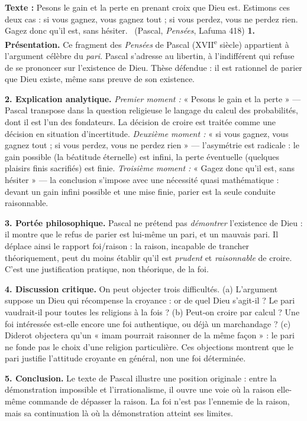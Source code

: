 \documentclass[11pt]{article}
\begin{document}
\begin{exoresolu}
\textbf{Texte :} \guillemotleft Pesons le gain et la perte en prenant croix que Dieu est. Estimons ces deux cas : si vous gagnez, vous gagnez tout ; si vous perdez, vous ne perdez rien. Gagez donc qu'il est, sans hésiter. \guillemotright\ (Pascal, \emph{Pensées}, Lafuma 418)
\tcblower
\textbf{1. Présentation.} Ce fragment des \emph{Pensées} de Pascal (XVII\textsuperscript{e} siècle) appartient à l'argument célèbre du \emph{pari}. Pascal s'adresse au libertin, à l'indifférent qui refuse de se prononcer sur l'existence de Dieu. Thèse défendue : il est rationnel de parier que Dieu existe, même sans preuve de son existence.

\textbf{2. Explication analytique.} \emph{Premier moment :} « Pesons le gain et la perte » — Pascal transpose dans la question religieuse le langage du calcul des probabilités, dont il est l'un des fondateurs. La décision de croire est traitée comme une décision en situation d'incertitude. \emph{Deuxième moment :} « si vous gagnez, vous gagnez tout ; si vous perdez, vous ne perdez rien » — l'asymétrie est radicale : le gain possible (la béatitude éternelle) est infini, la perte éventuelle (quelques plaisirs finis sacrifiés) est finie. \emph{Troisième moment :} « Gagez donc qu'il est, sans hésiter » — la conclusion s'impose avec une nécessité quasi mathématique : devant un gain infini possible et une mise finie, parier est la seule conduite raisonnable.

\textbf{3. Portée philosophique.} Pascal ne prétend pas \emph{démontrer} l'existence de Dieu : il montre que le refus de parier est lui-même un pari, et un mauvais pari. Il déplace ainsi le rapport foi/raison : la raison, incapable de trancher théoriquement, peut du moins établir qu'il est \emph{prudent} et \emph{raisonnable} de croire. C'est une justification pratique, non théorique, de la foi.

\textbf{4. Discussion critique.} On peut objecter trois difficultés. (a) L'argument suppose un Dieu qui récompense la croyance : or de quel Dieu s'agit-il ? Le pari vaudrait-il pour toutes les religions à la fois ? (b) Peut-on croire par calcul ? Une foi intéressée est-elle encore une foi authentique, ou déjà un marchandage ? (c) Diderot objectera qu'un « imam pourrait raisonner de la même façon » : le pari ne fonde pas le choix d'une religion particulière. Ces objections montrent que le pari justifie l'attitude croyante en général, non une foi déterminée.

\textbf{5. Conclusion.} Le texte de Pascal illustre une position originale : entre la démonstration impossible et l'irrationalisme, il ouvre une voie où la raison elle-même commande de dépasser la raison. La foi n'est pas l'ennemie de la raison, mais sa continuation là où la démonstration atteint ses limites.
\end{exoresolu}
\end{document}
